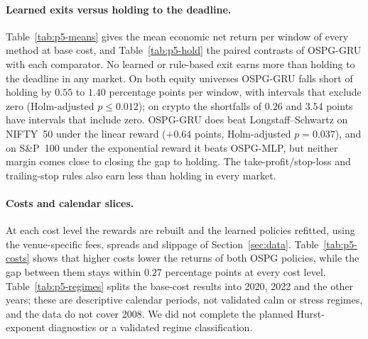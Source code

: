 \paragraph{Learned exits versus holding to the deadline.}
Table~\ref{tab:p5-means} gives the mean economic net return per window of every method at
base cost, and Table~\ref{tab:p5-hold} the paired contrasts of OSPG-GRU with each
comparator. No learned or rule-based exit earns more than holding to the deadline in any
market. On both equity universes OSPG-GRU falls short of holding by $0.55$ to $1.40$
percentage points per window, with intervals that exclude zero (Holm-adjusted
$p\le0.012$); on crypto the shortfalls of $0.26$ and $3.54$ points have intervals that
include zero. OSPG-GRU does beat Longstaff--Schwartz on NIFTY~50 under the linear reward
($+0.64$ points, Holm-adjusted $p=0.037$), and on S\&P~100 under the exponential reward it
beats OSPG-MLP, but neither margin comes close to closing the gap to holding. The
take-profit/stop-loss and trailing-stop rules also earn less than holding in every market.

\begin{table}[ht]
\centering\scriptsize
\caption{Mean economic net return per window (percent) at base cost, averaged over seeds,
windows weighted equally. Hold, TP/SL and Trailing are not trained, so they do not depend
on the objective.}
\label{tab:p5-means}

\end{table}

\begin{table}[ht]
\centering\scriptsize
\caption{OSPG-GRU minus each comparator at base cost: economic net return per window in
percentage points, with 95\% moving-block bootstrap interval. $^{*}$: Holm-adjusted
$p<0.05$ within the market, objective and cost family.}
\label{tab:p5-hold}
\resizebox{\linewidth}{!}{}
\end{table}

\paragraph{Costs and calendar slices.}
At each cost level the rewards are rebuilt and the learned policies refitted, using the
venue-specific fees, spreads and slippage of Section~\ref{sec:data}.
Table~\ref{tab:p5-costs} shows that higher costs lower the returns of both OSPG policies,
while the gap between them stays within $0.27$ percentage points at every cost level. Table~\ref{tab:p5-regimes} splits the base-cost
results into 2020, 2022 and the other years; these are descriptive calendar periods, not
validated calm or stress regimes, and the data do not cover 2008. We did not complete the
planned Hurst-exponent diagnostics or a validated regime classification.

